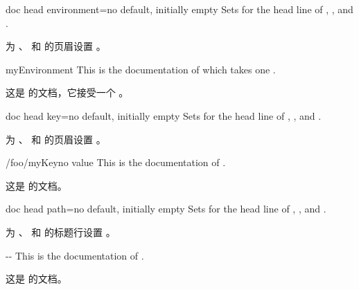 \begin{docTcbKey}{doc head environment}{=}{no default, initially empty}
Sets  for the head line of
, , and .

为 、 和  的页眉设置 。
\begin{dispExample}

\begin{docEnvironment*}{myEnvironment}{}
This is the documentation of  which
takes one .

这是  的文档，它接受一个 。
\end{docEnvironment*}
\end{dispExample}
\end{docTcbKey}

\begin{docTcbKey}{doc head key}{=}{no default, initially empty}
Sets  for the head line of
, , and .

为 、 和  的页眉设置 。
\begin{dispExample}

\begin{docKey}{/foo/myKey}{}{no value}
This is the documentation of .

这是  的文档。
\end{docKey}
\end{dispExample}
\end{docTcbKey}


\begin{docTcbKey}[][doc new=2019-09-18]{doc head path}{=}{no default, initially empty}
Sets  for the head line of
, , and .

为 、 和  的标题行设置 。
\begin{dispExample}

\begin{docPathOperation*}{-{}-}{}
This is the documentation of .

这是  的文档。
\end{docPathOperation*}
\end{dispExample}
\end{docTcbKey}


